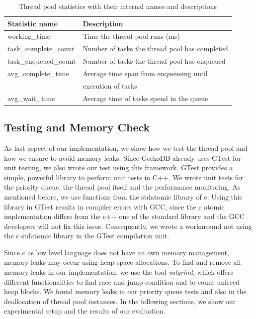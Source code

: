 \documentclass[conference]{IEEEtran}
\begin{document}
\begin{table}[htbp]
	\caption{Thread pool statistics with their internal names and descriptions}
	\begin{center}
		\begin{tabular}{ l l }
			\hline
			\textbf{Statistic name}&\textbf{Description}\\
			\hline
			working\_time & Time the thread pool runs (ms) \\
			task\_complete\_count & Number of tasks the thread pool has completed\\
			task\_enqueued\_count & Number of tasks the thread pool has enqueued \\
			avg\_complete\_time & Average time span from enqueueing until \\
			& execution of tasks \\
			avg\_wait\_time & Average time of tasks spend in the queue \\
			\hline
		\end{tabular}
		\label{tab4}
	\end{center}
\end{table}

\subsection{Testing and Memory Check}
As last aspect of our implementation, we show how we test the thread pool and how we ensure to avoid memory leaks. Since GeckoDB already uses GTest \cite{sen2010quick} for unit testing, we also wrote our test using this framework. GTest provides a simple, powerful library to perform unit tests in C++. We wrote unit tests for the priority queue, the thread pool itself and the performance monitoring. As mentioned before, we use functions from the stdatomic library of c. Using this library in GTest results in compiler errors with GCC, since the c atomic implementation differs from the c++ one of the standard library and the GCC developers will not fix this issue. Consequently, we wrote a workaround not using the c stdatomic library in the GTest compilation unit.

Since c as low level language does not have an own memory management, memory leaks may occur using heap space allocations. To find and remove all memory leaks in our implementation, we use the tool \emph{valgrind}, which offers different functionalities to find race and jump condition and to count unfreed heap blocks. We found memory leaks in our priority queue tests and also in the deallocation of thread pool instances. In the following sections, we show our experimental setup and the results of our evaluation.
\end{document}
